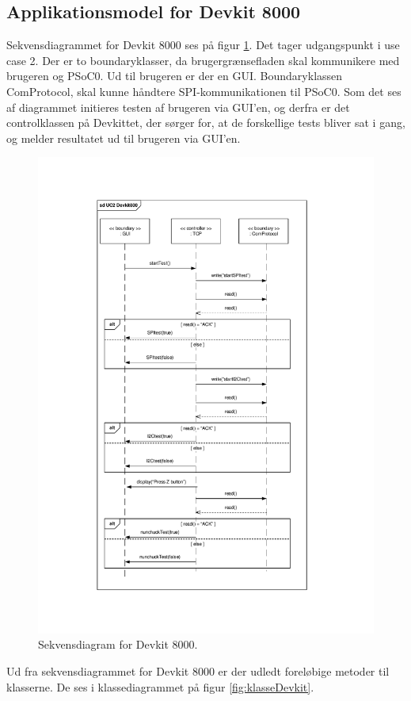 \subsection{Applikationsmodel for Devkit 8000}
Sekvensdiagrammet for Devkit 8000 ses på figur \ref{fig:sekvensDevkit}. Det tager udgangspunkt i use case 2. Der er to boundaryklasser, da brugergrænsefladen skal kommunikere med brugeren og PSoC0. Ud til brugeren er der en GUI. Boundaryklassen ComProtocol, skal kunne håndtere SPI-kommunikationen til PSoC0. Som det ses af diagrammet initieres testen af brugeren via GUI'en, og derfra er det controlklassen på Devkittet, der sørger for, at de forskellige tests bliver sat i gang, og melder resultatet ud til brugeren via GUI'en.

\begin{figure}[H]
	\centering
	\includegraphics[trim = {3.6cm 2.7cm 4cm 2.7cm}, clip = true, width=\textwidth] {Systemarkitektur/images/SekvensdiagramDevkit.pdf}
	\caption{Sekvensdiagram for Devkit 8000.}
	\label{fig:sekvensDevkit}
\end{figure}
Ud fra sekvensdiagrammet for Devkit 8000 er der udledt foreløbige metoder til klasserne. De ses i klassediagrammet på figur \ref{fig:klasseDevkit}. 

